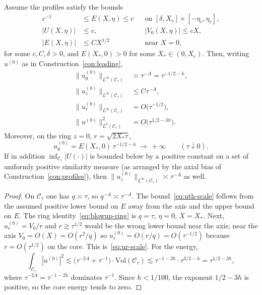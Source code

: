 \begin{proposition}
\label{prop:scales}
Assume the profiles satisfy the bounds
\begin{equation}
\label{eq:profile-bounds}
\begin{aligned}
c^{-1} &\le E(X,\eta) \le c &&\text{on }[\delta,X_c]\times[-\eta_c,\eta_c],\\
|U(X,\eta)| &\le c, && |V_0(X,\eta)|\le cX,\\
|E(X,\eta)| &\le C X^{1/2} &&\text{near }X=0,
\end{aligned}
\end{equation}
for some $c,C,\delta>0$, and $E(X_*,0)>0$ for some $X_*\in(0,X_c)$. Then, writing $u^{(0)}$ as in Construction~\ref{con:leading},
\begin{align}
\|u^{(0)}_\theta\|_{L^\infty(\mathcal C_\tau)}
&\asymp \tau^{-A}=\tau^{-1/2-h},
\label{eq:uth-scale}\\
\|u^{(0)}_z\|_{L^\infty(\mathcal C_\tau)}
&\le C\tau^{-A},
\label{eq:uz-scale}\\
\|u^{(0)}_r\|_{L^\infty(\mathcal C_\tau)}
&= O\bigl(\tau^{-1/2}\bigr),
\label{eq:ur-scale}\\
\|u^{(0)}\|_{L^2(\mathcal C_\tau)}^2
&= O\bigl(\tau^{1/2-3h}\bigr).
\label{eq:energy-core}
\end{align}
Moreover, on the ring $z=0$, $r=\sqrt{2X_*\tau}$,
\begin{equation}
\label{eq:blowup-ring}
u^{(0)}_\theta = E(X_*,0)\,\tau^{-1/2-h}\ \longrightarrow\ +\infty
\qquad(\tau\downarrow 0).
\end{equation}
If in addition $\inf_{\mathcal C_\tau}|U(\cdot)|$ is bounded below by a positive constant on a set of uniformly positive similarity measure (as arranged by the axial bias of Construction~\ref{con:profiles}), then $\|u^{(0)}_z\|_{L^\infty(\mathcal C_\tau)}\asymp\tau^{-A}$ as well.
\end{proposition}

\begin{proof}
On $\mathcal C_\tau$ one has $q\asymp\tau$, so $q^{-A}\asymp\tau^{-A}$. The bound~\eqref{eq:uth-scale} follows from the assumed positive lower bound on $E$ away from the axis and the upper bound on $E$. The ring identity~\eqref{eq:blowup-ring} is $q=\tau$, $\eta=0$, $X=X_*$. Next, $u^{(0)}_r=V_0/r$ and $r\gtrsim \tau^{1/2}$ would be the wrong lower bound near the axis; near the axis $V_0=O(X)=O(r^2/q)$ so $u^{(0)}_r=O(r/q)=O(\tau^{-1/2})$ because $r=O(\tau^{1/2})$ on the core. This is~\eqref{eq:ur-scale}. For the energy,
\[
\int_{\mathcal C_\tau}|u^{(0)}|^2
\lesssim
\bigl(\tau^{-2A}+\tau^{-1}\bigr)\cdot \mathrm{Vol}(\mathcal C_\tau)
\lesssim
\tau^{-1-2h}\cdot\tau^{3/2-h}
=\tau^{1/2-3h},
\]
where $\tau^{-2A}=\tau^{-1-2h}$ dominates $\tau^{-1}$. Since $h<1/100$, the exponent $1/2-3h$ is positive, so the core energy tends to zero.
\end{proof}

